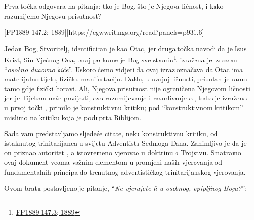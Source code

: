 
Prva točka  odgovara na pitanja: tko je Bog, što je Njegova ličnost, i kako razumijemo Njegovu prisutnost?

[FP1889 147.2; 1889][https://egwwritings.org/read?panels=p931.6]

Jedan Bog, Stvoritelj, identificiran je kao Otac, jer druga točka  navodi da je Isus Krist, Sin Vječnog Oca, onaj po kome je Bog sve stvorio\footnote{\href{https://egwwritings.org/?ref=en_FP1889.147.3&para=931.7}{FP1889 147.3; 1889}}.  izražena je izrazom “\textit{osobno duhovno biće}”. Uskoro ćemo vidjeti da ovaj izraz označava da Otac ima materijalno tijelo, fizičku manifestaciju. Dakle, u svojoj ličnosti, prisutan je samo tamo gdje fizički boravi. Ali, Njegova prisutnost nije ograničena Njegovom ličnosti jer je  Tijekom naše povijesti, ovo razumijevanje i rasuđivanje o , kako je izraženo u prvoj točki , primilo je konstruktivnu kritiku; pod “konstruktivnom kritikom” mislimo na kritiku koja je poduprta Biblijom.

Sada vam predstavljamo sljedeće citate, neku konstruktivnu kritiku, od istaknutog trinitarijanca u svijetu Adventista Sedmoga Dana. Zanimljivo je da je on priznao autoritet , a istovremeno vjerovao u doktrinu o Trojstvu. Smatramo ovaj dokument veoma važnim elementom u promjeni naših vjerovanja od fundamentalnih principa do trenutnog adventističkog trinitarijanskog vjerovanja.

Ovom bratu postavljeno je pitanje, “\textit{Ne vjerujete li u osobnog, opipljivog Boga?}”:


